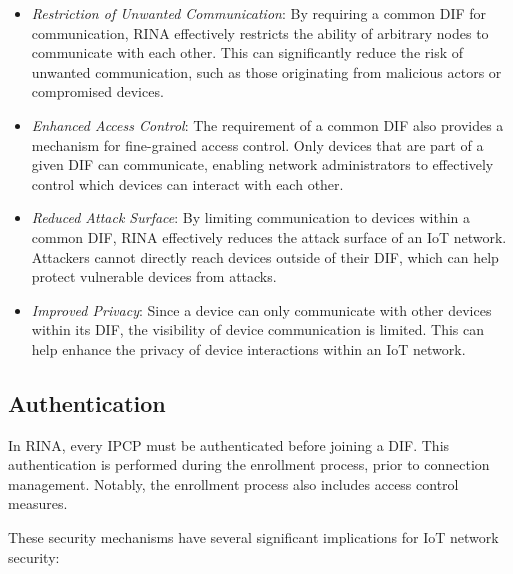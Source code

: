 \documentclass{ieeeaccess}
\begin{document}
\begin{itemize}
	\item \textit{Restriction of Unwanted Communication}: By requiring a common DIF for communication, RINA effectively restricts the ability of arbitrary nodes to communicate with each other. This can significantly reduce the risk of unwanted communication, such as those originating from malicious actors or compromised devices.
	\item \textit{Enhanced Access Control}: The requirement of a common DIF also provides a mechanism for fine-grained access control. Only devices that are part of a given DIF can communicate, enabling network administrators to effectively control which devices can interact with each other.
	\item \textit{Reduced Attack Surface}: By limiting communication to devices within a common DIF, RINA effectively reduces the attack surface of an IoT network. Attackers cannot directly reach devices outside of their DIF, which can help protect vulnerable devices from attacks.
	\item \textit{Improved Privacy}: Since a device can only communicate with other devices within its DIF, the visibility of device communication is limited. This can help enhance the privacy of device interactions within an IoT network.
\end{itemize}

\subsection{Authentication}

In RINA, every IPCP must be authenticated before joining a DIF. This authentication is performed during the enrollment process, prior to connection management. Notably, the enrollment process also includes access control measures.

These security mechanisms have several significant implications for IoT network security:
\end{document}
